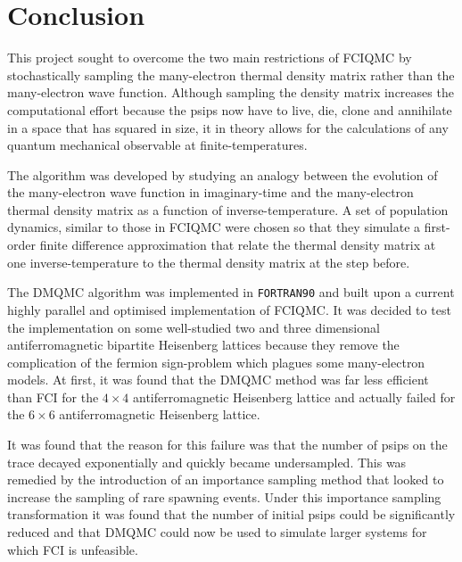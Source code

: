 \def\baselinestretch{1}
\chapter{Conclusion}
\ifpdf
    \graphicspath{{Conclusions/ConclusionsFigs/PNG/}{Conclusions/ConclusionsFigs/PDF/}{Conclusions/ConclusionsFigs/}}
\else
    \graphicspath{{Conclusions/ConclusionsFigs/EPS/}{Conclusions/ConclusionsFigs/}}
\fi

\def\baselinestretch{1.66}

This project sought to overcome the two main restrictions of FCIQMC by stochastically sampling the many-electron thermal density matrix rather than the many-electron wave function. Although sampling the density matrix increases the computational effort because the psips now have to live, die, clone and annihilate in a space that has squared in size, it in theory allows for the calculations of any quantum mechanical observable at finite-temperatures. 

The algorithm was developed by studying an analogy between the evolution of the many-electron wave function in imaginary-time and the many-electron thermal density matrix as a function of inverse-temperature. A set of population dynamics, similar to those in FCIQMC were chosen so that they simulate a first-order finite difference approximation that relate the thermal density matrix at one inverse-temperature to the thermal density matrix at the step before. 

The DMQMC algorithm was implemented in \texttt{FORTRAN90} and built upon a current highly parallel and optimised implementation of FCIQMC. It was decided to test the implementation on some well-studied two and three dimensional antiferromagnetic bipartite Heisenberg lattices because they remove the complication of the fermion sign-problem which plagues some many-electron models. At first, it was found that the DMQMC method was far less efficient than FCI for the $4\times4$ antiferromagnetic Heisenberg lattice and actually failed for the $6\times6$ antiferromagnetic Heisenberg lattice.

It was found that the reason for this failure was that the number of psips on the trace decayed exponentially and quickly became undersampled. This was remedied by the introduction of an importance sampling method that looked to increase the sampling of rare spawning events. Under this importance sampling transformation it was found that the number of initial psips could be significantly reduced and that DMQMC could now be used to simulate larger systems for which FCI is unfeasible. 

